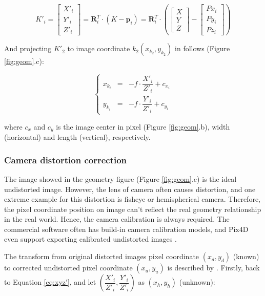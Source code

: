 \documentclass[doublespacing]{configs/bmcart}
\begin{document}
\begin{equation} \label{eq:ki'}
K'_i = 
  \left[
    \begin{array}{c} X'_i \\ Y'_i \\ Z'_i \end{array} 
  \right]
  =
  \mathbf{R}_i^T \cdot (K - \mathbf{p}_i)
  =
  \mathbf{R}_i^T \cdot
  \left(
    \left[\begin{matrix} X \\ Y \\ Z \end{matrix}\right] - 
    \left[\begin{matrix} Px_i \\ Py_i \\ Pz_i \end{matrix}\right]
  \right)
\end{equation}

And projecting $K'_2$ to image coordinate $k_2 (x_{k_2}, y_{k_2})$ in follows \cite{pix4d_support_how_2020} (Figure \ref{fig:geom}.c):

\begin{equation}  \label{eq:xyz'}
  \left\{
  \begin{matrix}
    x_{k_i}  & = & - f \cdot \dfrac{X'_i}{Z'_i} + c_{x_i} \\
    y_{k_i}  & = & - f \cdot \dfrac{Y'_i}{Z'_i} + c_{y_i}
  \end{matrix}
  \right.
\end{equation}

\noindent where $c_x$ and $c_y$ is the image center in pixel (Figure \ref{fig:geom}.b), width (horizontal) and length (vertical), respectively. 

\subsubsection*{Camera distortion correction}
The image showed in the geometry figure (Figure \ref{fig:geom}.c) is the ideal undistorted image. However, the lens of camera often causes distortion, and one extreme example for this distortion is fisheye or hemispherical camera. Therefore, the pixel coordinate position on image can't reflect the real geometry relationship in the real world. Hence, the camera calibration is always required. The commercial software often has build-in camera calibration models, and Pix4D even support exporting calibrated undistorted images \cite{pix4d_support_menu_2020}. 

The transform from original distorted images pixel coordinate $(x_d, y_d)$ (known) to corrected undistorted pixel coordinate $(x_u, y_u)$ is described by \cite{pix4d_support_how_2020}. Firstly, back to Equation \ref{eq:xyz'}, and let $(\dfrac{X'_i}{Z'_i}, \dfrac{Y'_i}{Z'_i})$ as $(x_h, y_h)$ (unknown):
\end{document}
